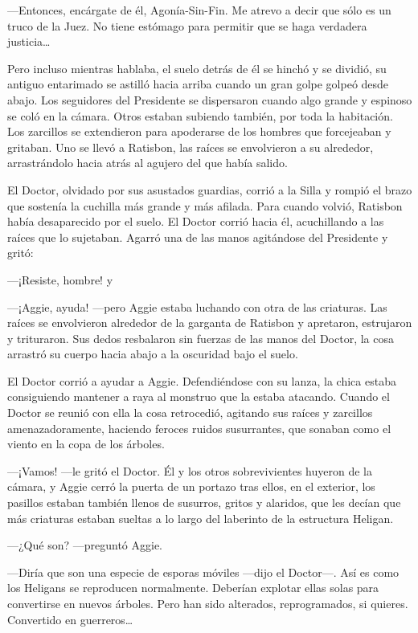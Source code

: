---Entonces, encárgate de él, Agonía-Sin-Fin. Me atrevo a decir que sólo
es un truco de la Juez. No tiene estómago para permitir que se haga
verdadera justicia\ldots{}

Pero incluso mientras hablaba, el suelo detrás de él se hinchó y se
dividió, su antiguo entarimado se astilló hacia arriba cuando un gran
golpe golpeó desde abajo. Los seguidores del Presidente se dispersaron
cuando algo grande y espinoso se coló en la cámara. Otros estaban
subiendo también, por toda la habitación. Los zarcillos se extendieron
para apoderarse de los hombres que forcejeaban y gritaban. Uno se llevó
a Ratisbon, las raíces se envolvieron a su alrededor, arrastrándolo
hacia atrás al agujero del que había salido.

El Doctor, olvidado por sus asustados guardias, corrió a la Silla y
rompió el brazo que sostenía la cuchilla más grande y más afilada. Para
cuando volvió, Ratisbon había desaparecido por el suelo. El Doctor
corrió hacia él, acuchillando a las raíces que lo sujetaban. Agarró una
de las manos agitándose del Presidente y gritó:

---¡Resiste, hombre! y

---¡Aggie, ayuda! ---pero Aggie estaba luchando con otra de las
criaturas. Las raíces se envolvieron alrededor de la garganta de
Ratisbon y apretaron, estrujaron y trituraron. Sus dedos resbalaron sin
fuerzas de las manos del Doctor, la cosa arrastró su cuerpo hacia abajo
a la oscuridad bajo el suelo.

El Doctor corrió a ayudar a Aggie. Defendiéndose con su lanza, la chica
estaba consiguiendo mantener a raya al monstruo que la estaba atacando.
Cuando el Doctor se reunió con ella la cosa retrocedió, agitando sus
raíces y zarcillos amenazadoramente, haciendo feroces ruidos
susurrantes, que sonaban como el viento en la copa de los árboles.

---¡Vamos! ---le gritó el Doctor. Él y los otros sobrevivientes huyeron
de la cámara, y Aggie cerró la puerta de un portazo tras ellos, en el
exterior, los pasillos estaban también llenos de susurros, gritos y
alaridos, que les decían que más criaturas estaban sueltas a lo largo
del laberinto de la estructura Heligan.

---¿Qué son? ---preguntó Aggie.

---Diría que son una especie de esporas móviles ---dijo el Doctor---.
Así es como los Heligans se reproducen normalmente. Deberían explotar
ellas solas para convertirse en nuevos árboles. Pero han sido alterados,
reprogramados, si quieres. Convertido en guerreros\ldots{}

